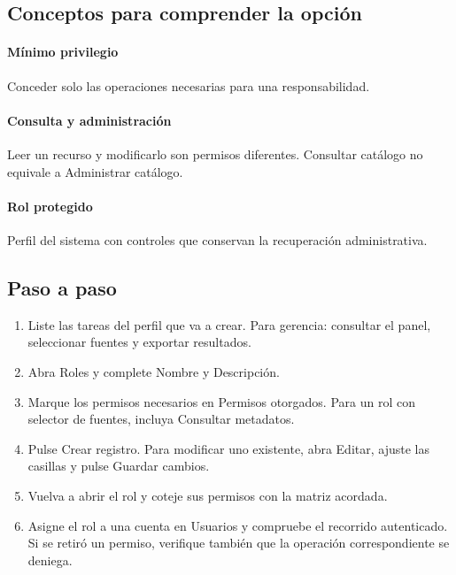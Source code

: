 \subsection{Conceptos para comprender la opción}
\paragraph{Mínimo privilegio} Conceder solo las operaciones necesarias para una responsabilidad.

\paragraph{Consulta y administración} Leer un recurso y modificarlo son permisos diferentes. Consultar catálogo no equivale a Administrar catálogo.

\paragraph{Rol protegido} Perfil del sistema con controles que conservan la recuperación administrativa.

\subsection{Paso a paso}
\begin{enumerate}
\item Liste las tareas del perfil que va a crear. Para gerencia: consultar el panel, seleccionar fuentes y exportar resultados.
\item Abra Roles y complete Nombre y Descripción.
\item Marque los permisos necesarios en Permisos otorgados. Para un rol con selector de fuentes, incluya Consultar metadatos.
\item Pulse Crear registro. Para modificar uno existente, abra Editar, ajuste las casillas y pulse Guardar cambios.
\item Vuelva a abrir el rol y coteje sus permisos con la matriz acordada.
\item Asigne el rol a una cuenta en Usuarios y compruebe el recorrido autenticado. Si se retiró un permiso, verifique también que la operación correspondiente se deniega.
\end{enumerate}

